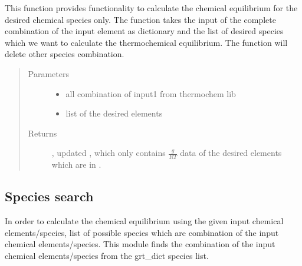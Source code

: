 \documentclass[letterpaper,10pt,english]{sphinxmanual}
\begin{document}
\begin{fulllineitems}
This function provides functionality to calculate the chemical equilibrium for the desired chemical species only. The function takes the input of the complete combination of the input element as dictionary and the list of desired species which we want to calculate the thermochemical equilibrium. The function will delete other species combination.
\begin{quote}\begin{description}
\item[{Parameters}] \leavevmode\begin{itemize}
\item {} 
 \textendash{} all combination of input1 from thermochem lib

\item {} 
 \textendash{} list of the desired elements

\end{itemize}

\item[{Returns}] \leavevmode
{}, updated , which only contains \(\frac{g}{RT}\) data of the desired elements which are in .

\end{description}\end{quote}

\end{fulllineitems}



\subsection{Species search}
\label{\detokenize{code_structure:species-search}}

In order to calculate the chemical equilibrium using the given input chemical elements/species, list of possible species which are combination of the input chemical elements/species. This module finds the combination of the input chemical elements/species from the grt\_dict species list.
\end{document}
